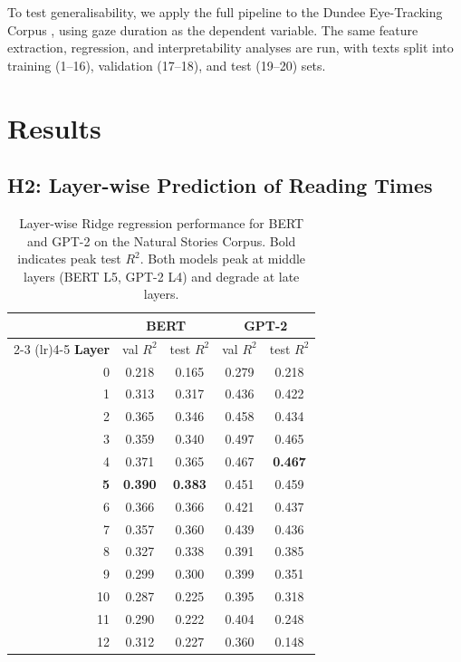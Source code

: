 \documentclass[11pt]{article}
\begin{document}
To test generalisability, we apply the full pipeline to the Dundee Eye-Tracking Corpus \citep{kennedy2003}, using gaze duration as the dependent variable.
The same feature extraction, regression, and interpretability analyses are run, with texts split into training (1--16), validation (17--18), and test (19--20) sets.

\section{Results}

\subsection{H2: Layer-wise Prediction of Reading Times}

\begin{table}[t]
\centering
\small
\begin{tabular}{r cc cc}
\toprule
& \multicolumn{2}{c}{\textbf{BERT}} & \multicolumn{2}{c}{\textbf{GPT-2}} \\
\cmidrule(lr){2-3} \cmidrule(lr){4-5}
\textbf{Layer} & val $R^2$ & test $R^2$ & val $R^2$ & test $R^2$ \\
\midrule
0  & 0.218 & 0.165 & 0.279 & 0.218 \\
1  & 0.313 & 0.317 & 0.436 & 0.422 \\
2  & 0.365 & 0.346 & 0.458 & 0.434 \\
3  & 0.359 & 0.340 & 0.497 & 0.465 \\
4  & 0.371 & 0.365 & 0.467 & \textbf{0.467} \\
\textbf{5}  & \textbf{0.390} & \textbf{0.383} & 0.451 & 0.459 \\
6  & 0.366 & 0.366 & 0.421 & 0.437 \\
7  & 0.357 & 0.360 & 0.439 & 0.436 \\
8  & 0.327 & 0.338 & 0.391 & 0.385 \\
9  & 0.299 & 0.300 & 0.399 & 0.351 \\
10 & 0.287 & 0.225 & 0.395 & 0.318 \\
11 & 0.290 & 0.222 & 0.404 & 0.248 \\
12 & 0.312 & 0.227 & 0.360 & 0.148 \\
\bottomrule
\end{tabular}
\caption{Layer-wise Ridge regression performance for BERT and GPT-2 on the Natural Stories Corpus. Bold indicates peak test $R^2$. Both models peak at middle layers (BERT L5, GPT-2 L4) and degrade at late layers.}
\label{tab:layerwise}
\end{table}
\end{document}
